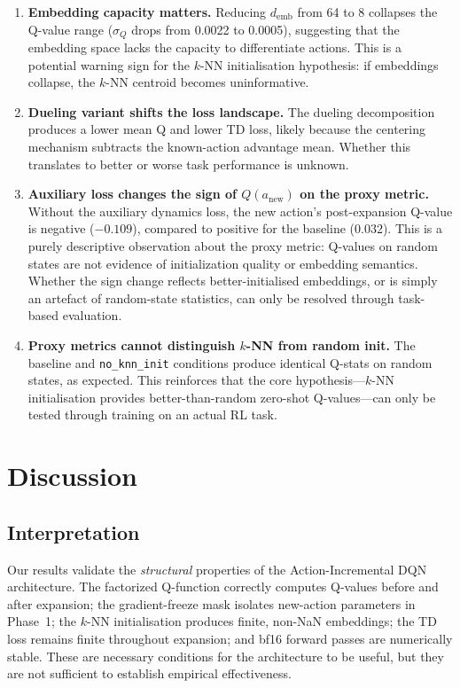 \documentclass{article}
\begin{document}
\begin{enumerate}
  \item \textbf{Embedding capacity matters.} Reducing $d_\text{emb}$ from 64 to 8 collapses the Q-value range ($\sigma_Q$ drops from 0.0022 to 0.0005), suggesting that the embedding space lacks the capacity to differentiate actions. This is a potential warning sign for the $k$-NN initialisation hypothesis: if embeddings collapse, the $k$-NN centroid becomes uninformative.
  \item \textbf{Dueling variant shifts the loss landscape.} The dueling decomposition produces a lower mean Q and lower TD loss, likely because the centering mechanism subtracts the known-action advantage mean. Whether this translates to better or worse task performance is unknown.
  \item \textbf{Auxiliary loss changes the sign of $Q(a_\text{new})$ on the proxy metric.} Without the auxiliary dynamics loss, the new action's post-expansion Q-value is negative ($-0.109$), compared to positive for the baseline ($0.032$). This is a purely descriptive observation about the proxy metric: Q-values on random states are not evidence of initialization quality or embedding semantics. Whether the sign change reflects better-initialised embeddings, or is simply an artefact of random-state statistics, can only be resolved through task-based evaluation.
  \item \textbf{Proxy metrics cannot distinguish $k$-NN from random init.} The baseline and \texttt{no\_knn\_init} conditions produce identical Q-stats on random states, as expected. This reinforces that the core hypothesis---$k$-NN initialisation provides better-than-random zero-shot Q-values---can only be tested through training on an actual RL task.
\end{enumerate}


\section{Discussion}
\label{sec:discussion}

\subsection{Interpretation}

Our results validate the \emph{structural} properties of the Action-Incremental DQN architecture. The factorized Q-function correctly computes Q-values before and after expansion; the gradient-freeze mask isolates new-action parameters in Phase~1; the $k$-NN initialisation produces finite, non-NaN embeddings; the TD loss remains finite throughout expansion; and bf16 forward passes are numerically stable. These are necessary conditions for the architecture to be useful, but they are not sufficient to establish empirical effectiveness.
\end{document}
